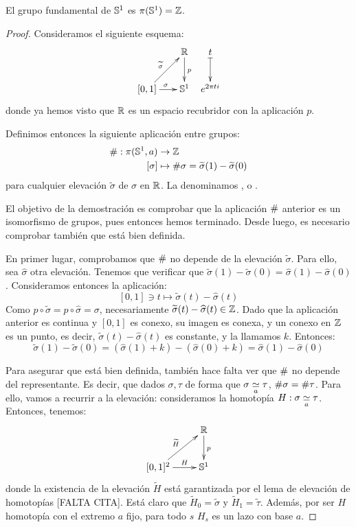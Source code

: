\begin{theo}
\label{grf_circulo}

El grupo fundamental de $\Sfe^1$ es $\pi(\Sfe^1)=\Z$.

\begin{proof}
Consideramos el siguiente esquema:
\[\xymatrix @C = 0.5pc {
&&\R \ar[d]^p & t \ar@{|->}[d] \\
[0,1] \ar[rr]^\sigma \ar[rru]^{\widetilde{\sigma}} & & \Sfe^1 & e^{2\pi ti}
}\]
donde ya hemos visto que $\R$ es un espacio recubridor con la aplicación $p$.

Definimos entonces la siguiente aplicación entre grupos:
\[\begin{split}
\indice:\pi(\Sfe^1,a)&\to\Z \\
[\sigma] &\mapsto \indice\sigma = \widetilde{\sigma}(1)-\widetilde{\sigma}(0)
\end{split}\]
para cualquier elevación $\widetilde{\sigma}$ de $\sigma$ en $\R$. La denominamos ,  o .

El objetivo de la demostración es comprobar que la aplicación $\indice$ anterior es un isomorfismo de grupos, pues entonces hemos terminado. Desde luego, es necesario comprobar también que está bien definida.

En primer lugar, comprobamos que $\indice$ no depende de la elevación $\widetilde{\sigma}$. Para ello, sea $\widehat{\sigma}$ otra elevación. Tenemos que verificar que $\widetilde{\sigma}(1)-\widetilde{\sigma}(0) = \widehat{\sigma}(1) - \widehat{\sigma}(0)$. Consideramos entonces la aplicación:
\[[0,1]\ni t\mapsto \widetilde{\sigma}(t) - \widehat{\sigma}(t)\]
Como $p\circ\widetilde{\sigma} = p\circ\widehat{\sigma} = \sigma$, necesariamente $\widetilde{\sigma}(t) - \widehat{\sigma}(t)\in\Z$. Dado que la aplicación anterior es continua y $[0,1]$ es conexo, su imagen es conexa, y un conexo en $\Z$ es un punto, es decir, $\widetilde{\sigma}(t) - \widehat{\sigma}(t)$ es constante, y la llamamos $k$. Entonces:
\[\widetilde{\sigma}(1)-\widetilde{\sigma}(0) = (\widehat{\sigma}(1) + k) - (\widehat{\sigma}(0) + k) = \widehat{\sigma}(1) - \widehat{\sigma}(0)\]

Para asegurar que está bien definida, también hace falta ver que $\indice$ no depende del representante. Es decir, que dados $\sigma,\tau$ de forma que $\sigma\homot[a]\tau$, $\indice\sigma = \indice\tau$. Para ello, vamos a recurrir a la elevación: consideramos la homotopía $H:\sigma\homot[a]\tau$. Entonces, tenemos:
\[\xymatrix{
& \R \ar[d]^p \\
[0,1]^2 \ar[ru]^{\widetilde{H}} \ar[r]^-H & \Sfe^1
}\]
donde la existencia de la elevación $\widetilde{H}$ está garantizada por el lema de elevación de homotopías [FALTA CITA]. Está claro que $\widetilde{H}_0 = \widetilde{\sigma}$ y $\widetilde{H}_1 = \widetilde{\tau}$. Además, por ser $H$ homotopía con el extremo $a$ fijo, para todo $s$ $H_s$ es un lazo con base $a$.


\end{proof}
\end{theo}
